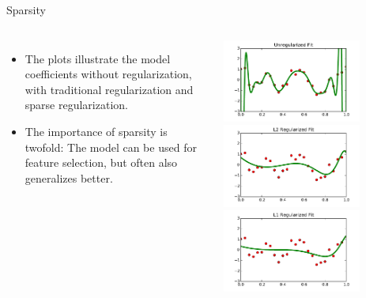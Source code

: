 \documentclass[10pt, aspectratio=169]{beamer} %
\newcommand{\leveys}{0.75\textwidth}
\begin{document}
\begin{frame}{Sparsity}
\begin{columns}
\begin{itemize}
\item The plots illustrate the model coefficients without regularization,
with traditional regularization and sparse regularization.
\item The importance of sparsity is twofold: The model can be used for feature
selection, but often also generalizes better.
\end{itemize}
\includegraphics[width=\leveys]{unreg_fit.pdf}\\
\includegraphics[width=\leveys]{L2_fit.pdf}\\
\includegraphics[width=\leveys]{L1_fit.pdf}

\end{columns}
\end{frame}
\end{document}
